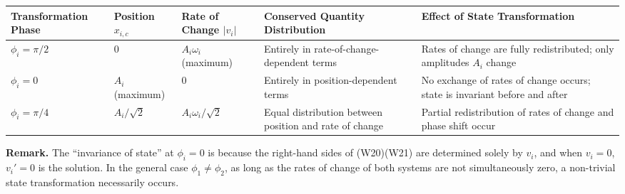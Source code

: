 \documentclass[a4paper,11pt]{article}
\newcounter{none}
\begin{document}
{\def\LTcaptype{none} %
\begin{longtable}[]{@{}
  >{\raggedright\arraybackslash}p{}
  >{\raggedright\arraybackslash}p{}
  >{\raggedright\arraybackslash}p{}
  >{\raggedright\arraybackslash}p{}
  >{\raggedright\arraybackslash}p{}@{}}
\toprule\noalign{}
\begin{minipage}[b]{\linewidth}\raggedright
Transformation Phase
\end{minipage} & \begin{minipage}[b]{\linewidth}\raggedright
Position \(x_{i,c}\)
\end{minipage} & \begin{minipage}[b]{\linewidth}\raggedright
Rate of Change \(|v_i|\)
\end{minipage} & \begin{minipage}[b]{\linewidth}\raggedright
Conserved Quantity Distribution
\end{minipage} & \begin{minipage}[b]{\linewidth}\raggedright
Effect of State Transformation
\end{minipage} \\
\midrule\noalign{}
\endhead
\bottomrule\noalign{}
\endlastfoot
\(\phi_i = \pi/2\) & \(0\) & \(A_i\omega_i\) (maximum) & Entirely in
rate-of-change-dependent terms & Rates of change are fully
redistributed; only amplitudes \(A_i\) change \\
\(\phi_i = 0\) & \(A_i\) (maximum) & \(0\) & Entirely in
position-dependent terms & No exchange of rates of change occurs; state
is invariant before and after \\
\(\phi_i = \pi/4\) & \(A_i/\sqrt{2}\) & \(A_i\omega_i/\sqrt{2}\) & Equal
distribution between position and rate of change & Partial
redistribution of rates of change and phase shift occur \\
\end{longtable}
}

\textbf{Remark.} The ``invariance of state'' at \(\phi_i = 0\) is
because the right-hand sides of (W20)(W21) are determined solely by
\(v_i\), and when \(v_i = 0\), \(v_i' = 0\) is the solution. In the
general case \(\phi_1 \neq \phi_2\), as long as the rates of change of
both systems are not simultaneously zero, a non-trivial state
transformation necessarily occurs.
\end{document}
